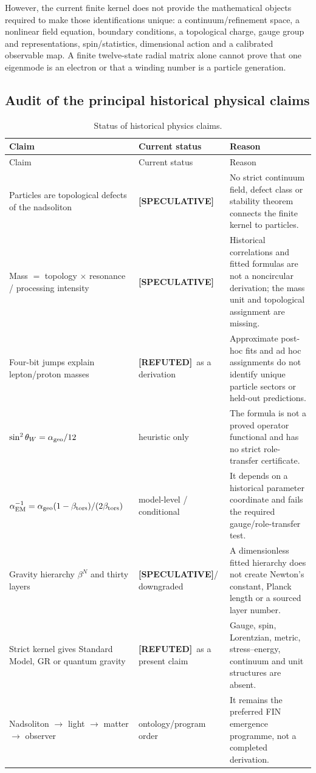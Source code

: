 \documentclass[11pt,a4paper]{article}
\theoremstyle{definition}
\theoremstyle{remark}
\newcommand{\status}[2]{\textcolor{#1}{\textbf{[#2]}}}
\newcommand{\speculative}{\status{finpurple}{SPECULATIVE}}
\newcommand{\refuted}{\status{finred}{REFUTED}}
\begin{document}
However, the current finite kernel does not provide the mathematical objects required to make those identifications unique: a continuum/refinement space, a nonlinear field equation, boundary conditions, a topological charge, gauge group and representations, spin/statistics, dimensional action and a calibrated observable map. A finite twelve-state radial matrix alone cannot prove that one eigenmode is an electron or that a winding number is a particle generation.

\subsection{Audit of the principal historical physical claims}

\begin{longtable}{@{}p{}p{}p{}@{}}
\caption{Status of historical physics claims.}\\
\toprule
Claim & Current status & Reason\\
\midrule
\endfirsthead
\toprule
Claim & Current status & Reason\\
\midrule
\endhead
Particles are topological defects of the nadsoliton & \speculative & No strict continuum field, defect class or stability theorem connects the finite kernel to particles.\\
Mass $=$ topology $\times$ resonance / processing intensity & \speculative & Historical correlations and fitted formulas are not a noncircular derivation; the mass unit and topological assignment are missing.\\
Four-bit jumps explain lepton/proton masses & \refuted\ as a derivation & Approximate post-hoc fits and ad hoc assignments do not identify unique particle sectors or held-out predictions.\\
\(\sin^2\theta_W=\alpha_{\rm geo}/12\) & heuristic only & The formula is not a proved operator functional and has no strict role-transfer certificate.\\
\(\alpha_{\rm EM}^{-1}=\alpha_{\rm geo}(1-\beta_{\rm tors})/(2\beta_{\rm tors})\) & model-level / conditional & It depends on a historical parameter coordinate and fails the required gauge/role-transfer test.\\
Gravity hierarchy $\beta^N$ and thirty layers & \speculative / downgraded & A dimensionless fitted hierarchy does not create Newton's constant, Planck length or a sourced layer number.\\
Strict kernel gives Standard Model, GR or quantum gravity & \refuted\ as a present claim & Gauge, spin, Lorentzian, metric, stress--energy, continuum and unit structures are absent.\\
Nadsoliton $\to$ light $\to$ matter $\to$ observer & ontology/program order & It remains the preferred FIN emergence programme, not a completed derivation.\\
\bottomrule
\end{longtable}
\end{document}
